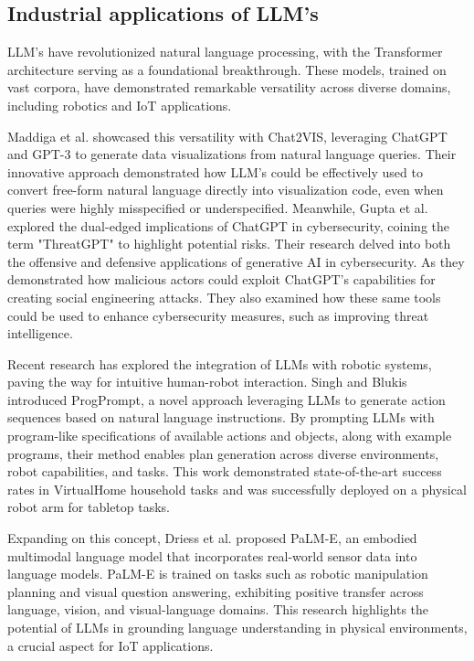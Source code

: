 \documentclass{ieeeaccess}
\begin{document}
\subsection{Industrial applications of LLM's}
LLM's have revolutionized natural language processing, with the Transformer architecture \cite{DBLP:journals/corr/VaswaniSPUJGKP17} serving as a foundational breakthrough. These models, trained on vast corpora, have demonstrated remarkable versatility across diverse domains, including robotics and IoT applications. 

Maddiga et al. \cite{10121440} showcased this versatility with Chat2VIS, leveraging ChatGPT and GPT-3 to generate data visualizations from natural language queries. Their innovative approach demonstrated how LLM's could be effectively used to convert free-form natural language directly into visualization code, even when queries were highly misspecified or underspecified. Meanwhile, Gupta et al. \cite{10198233} explored the dual-edged implications of ChatGPT in cybersecurity, coining the term "ThreatGPT" to highlight potential risks. Their research delved into both the offensive and defensive applications of generative AI in cybersecurity. As they demonstrated how malicious actors could exploit ChatGPT's capabilities for creating social engineering attacks. They also examined how these same tools could be used to enhance cybersecurity measures, such as improving threat intelligence.

Recent research has explored the integration of LLMs with robotic systems, paving the way for intuitive human-robot interaction. Singh and Blukis \cite{Singh2023} introduced ProgPrompt, a novel approach leveraging LLMs to generate action sequences based on natural language instructions. By prompting LLMs with program-like specifications of available actions and objects, along with example programs, their method enables plan generation across diverse environments, robot capabilities, and tasks. This work demonstrated state-of-the-art success rates in VirtualHome household tasks and was successfully deployed on a physical robot arm for tabletop tasks.

Expanding on this concept, Driess et al. \cite{10.5555/3618408.3618748} proposed PaLM-E, an embodied multimodal language model that incorporates real-world sensor data into language models. PaLM-E is trained on tasks such as robotic manipulation planning and visual question answering, exhibiting positive transfer across language, vision, and visual-language domains. This research highlights the potential of LLMs in grounding language understanding in physical environments, a crucial aspect for IoT applications.
\end{document}
